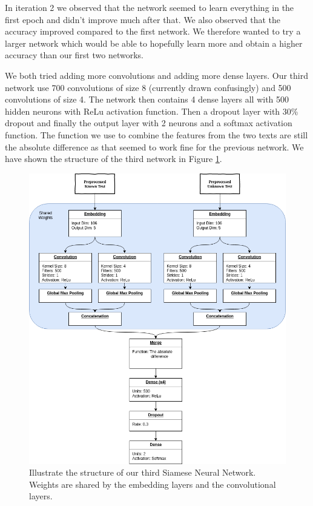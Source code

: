 In iteration 2 we observed that the network seemed to learn everything in the
first epoch and didn't improve much after that. We also observed that the
accuracy improved compared to the first network. We therefore wanted to try a
larger network which would be able to hopefully learn more and obtain a higher
accuracy than our first two networks.

We both tried adding more convolutions and adding more dense layers. Our third
network use 700 convolutions of size 8 (currently drawn confusingly) and 500
convolutions of size 4. The network then contains 4 dense layers all with 500
hidden neurons with \gls{ReLu} activation function. Then a dropout layer with
30\% dropout and finally the output layer with 2 neurons and a softmax
activation function. The function we use to combine the features from the two
texts are still the absolute difference as that seemed to work fine for the
previous network. We have shown the structure of the third network in Figure
\ref{fig:network3}.

\begin{figure}
    \centering
    \includegraphics[width=\textwidth]{./pictures/experiments/network3.png}
    \caption{Illustrate the structure of our third Siamese Neural Network.
        Weights are shared by the embedding layers and the convolutional
        layers.}
    \label{fig:network3}
\end{figure}

